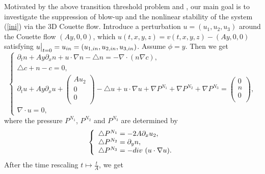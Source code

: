\documentclass[12pt, reqno]{amsart}
\numberwithin{equation}{section}
\begin{document}
Motivated by the above \textcolor[rgb]{0,0,0}{transition threshold problem} \cite{Bedro1} and \cite{wei2}, our main goal is to investigate the suppression of blow-up \textcolor[rgb]{0,0,0}{and} the nonlinear stability of the system (\ref{ini}) via the 3D Couette flow. Introduce a perturbation $u=(u_1,u_2,u_3)$ around the Couette flow $( Ay,0,0 )$, which $u(t,x,y,z)=v(t,x,y,z)-( Ay,0,0 )$ satisfying $u\big|_{t=0}=u_{\rm in}=(u_{1,\rm in}, u_{2,\rm in}, u_{3,\rm in})$. Assume $\phi=y$. Then we get
\begin{equation}\label{ini1}
	\left\{
	\begin{array}{lr}
		\partial_tn+Ay\partial_x n+u\cdot\nabla n-\triangle n=-\nabla\cdot(n\nabla c), \\
		\triangle c+n-c=0, \\
		\partial_tu+Ay\partial_x u+\left(
		\begin{array}{c}
			Au_2 \\
			0 \\
			0 \\
		\end{array}
		\right)
		-\triangle u+u\cdot\nabla u+\nabla P^{N_1}+\nabla P^{N_2}+\nabla P^{N_3}=\left(
		\begin{array}{c}
			0 \\
			n \\
			0 \\
		\end{array}
		\right), \\
		\nabla \cdot u=0,
	\end{array}
	\right.
\end{equation}
where the pressure $P^{N_1}$, $P^{N_2}$ and $P^{N_3}$ are determined by
\begin{equation}\label{pressure_1}
	\left\{
	\begin{array}{lr}
		\triangle P^{N_1}=-2A\partial_xu_2, \\
		\triangle P^{N_2}=\partial_yn, \\
		\triangle P^{N_3}=-{\rm div}~(u\cdot\nabla u).
	\end{array}
	\right.
\end{equation}
After the time rescaling $t\mapsto\frac{t}{A}$, we get
\end{document}
